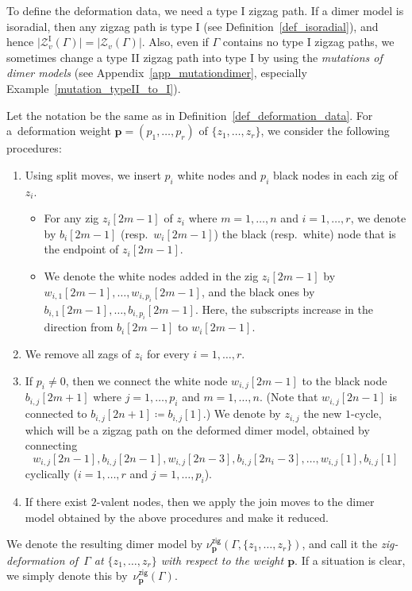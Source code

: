 \documentclass[pdftex]{sigma}%
\numberwithin{equation}{section}
\numberwithin{figure}{section}
\numberwithin{table}{section}
\newcommand{\rmI}{\mathrm{I}}
\newcommand{\calZ}{\mathcal{Z}}
\newcommand{\bfp}{\mathbf{p}}
\newcommand{\zig}{\mathsf{zig}}
\begin{document}
\begin{Remark}\label{rem_typeI_to_typeII}
To define the deformation data, we need a type I zigzag path.
If a dimer model is isoradial, then any zigzag path is type I (see Definition~\ref{def_isoradial}), and hence $\big|\calZ_v^\rmI(\Gamma)\big|=|\calZ_v(\Gamma)|$.
Also, even if $\Gamma$ contains no type I zigzag paths, we sometimes change a type II zigzag path into type I by using the \emph{mutations of dimer models}
(see Appendix~\ref{app_mutationdimer}, especially Example~\ref{mutation_typeII_to_I}).
\end{Remark}

\begin{Definition}\label{def_deformation_zig}
Let the notation be the same as in Definition~\ref{def_deformation_data}.
For a~deformation weight $\bfp=(p_1,\dots,p_r)$ of $\{z_1, \dots, z_r\}$, we consider the following procedures:
\begin{enumerate}
\setlength{\parskip}{0pt}\itemsep=0pt
\item Using split moves, we insert $p_i$ white nodes and $p_i$ black nodes in each zig of $z_i$.

\noindent{\bf [Notation]}
\begin{itemize}\itemsep=0pt
\item For any zig $z_i[2m-1]$ of $z_i$ where $m=1,\dots,n$ and $i=1,\dots,r$, we denote by $b_i[2m-1]$ (resp.~$w_i[2m-1]$) the black (resp.\ white) node that is the endpoint of $z_i[2m-1]$.
\item We denote the white nodes added in the zig $z_i[2m-1]$ by $w_{i,1}[2m-1],\dots,w_{i,p_i}[2m-1]$, and the black ones by $b_{i,1}[2m-1],\dots,b_{i,p_i}[2m-1]$.
Here, the subscripts increase in the direction from $b_i[2m-1]$ to $w_i[2m-1]$.
\end{itemize}
\item We remove all zags of $z_i$ for every $i=1,\dots,r$.
\item If $p_i\neq 0$, then we connect the white node $w_{i,j}[2m-1]$ to the black node $b_{i,j}[2m+1]$ where $j=1,\dots,p_i$ and $m=1,\dots,n$.
(Note that $w_{i,j}[2n-1]$ is connected to $b_{i,j}[2n+1]\coloneqq b_{i,j}[1]$.)
We denote by $z_{i,j}$ the new $1$-cycle, which will be a zigzag path on the deformed dimer model, obtained by connecting
\begin{displaymath}
w_{i,j}[2n-1], b_{i,j}[2n-1], w_{i,j}[2n-3], b_{i,j}[2n_i-3],\dots,w_{i,j}[1], b_{i,j}[1]
\end{displaymath}
cyclically ($i=1,\dots,r$ and $j=1,\dots,p_i$).
\item[(join)] If there exist $2$-valent nodes, then we apply the join moves to the dimer model obtained by the above procedures and make it reduced.
\end{enumerate}
We denote the resulting dimer model by $\nu^\zig_\bfp(\Gamma, \{z_1,\dots,z_r\})$,
and call it the \emph{zig-deformation of~$\Gamma$ at $\{z_1,\dots,z_r\}$ with respect to the weight $\bfp$}.
If a situation is clear, we simply denote this by~$\nu^\zig_\bfp(\Gamma)$.
\end{Definition}
\end{document}
